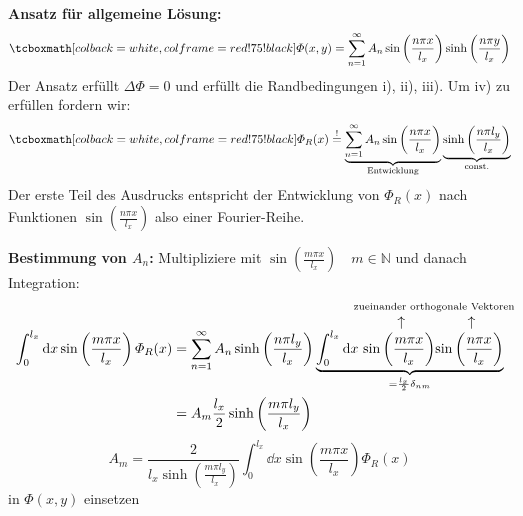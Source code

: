 \textbf{Ansatz für allgemeine Lösung:}
\begin{equation*}
\rmbox{\Phi(x,y) = \sum_{n=1}^{\infty} A_n \sin \left(\frac{n \pi x}{l_x}\right) \sinh \left(\frac{n \pi y}{l_x}\right)}
\end{equation*}
Der Ansatz erfüllt $ \Delta \Phi = 0 $ und erfüllt die Randbedingungen i), ii), iii). Um iv) zu erfüllen fordern wir:
\begin{equation*}
\rmbox{\Phi_R(x) \buildrel ! \over = \ub{\sum_{n=1}^{\infty} A_n \sin\left(\frac{n \pi x}{l_x}\right)}_{\tx{Entwicklung}} \ub{\sinh\left(\frac{n \pi l_y}{l_x}\right)}_{\const}}
\end{equation*}
Der erste Teil des Ausdrucks entspricht der Entwicklung von $ \Phi_R(x) $ nach Funktionen $ \sin \left(\frac{n \pi x}{l_x}\right) $ also einer Fourier-Reihe.\\[5pt]
\begin{comment}
\textbf{Bestimmung von $ A_n $:}
Multipliziere mit $ \sin\left(\frac{n \pi x}{l_x}\right) \quad m \in \mathbb{N} $ und danach Integration:
\begin{align*}
\int_{0}^{l_x} \dd x \sin\left(\frac{n \pi x}{l_x}\right) \Phi_R (x) &=\right)  \sum_{n=1}^{\infty} A_n \sinh\left(\frac{m \pi l_y}{l_x}\right) \int_{0}^{l_x} \dd x \ub{\custoup{\leftarrow}{\sin\left(\frac{m \pi x}{l_x}\right)}{\qquad \qquad \quad \mathclap{\tx{zueinander orthogonale Vektoren}}} \custoup{\leftarrow}{\sin\left(\frac{n \pi x}{l_x}\right)}{}}_{= \frac{l_x}{2} \delta_{nm}}\\
&= A_m \frac{l_x}{2} \sinh\left(\frac{n \pi l_y}{l_x}\right)
\end{align*}
\begin{equation*}
A_m = \frac{2}{l_x \sinh\left(\frac{n \pi l_y}{l_x}\right)} \int_{0}^{l_x} \dd x \sin \left(\frac{n \pi x}{l_x}\right) \Phi_R(x)
\end{equation*}
in $ \Phi(x,y) $ einsetzen\\[5pt]
\end{comment}
\textbf{Bestimmung von $ A_n $:}
Multipliziere mit $ \sin\left(\frac{m \pi x}{l_x}\right) \quad m \in \mathbb{N} $ und danach Integration:
\begin{align*}
\int_{0}^{l_x} \dd x \sin\left(\frac{m \pi x}{l_x}\right) \Phi_R (x) &= \sum_{n=1}^{\infty} A_n \sinh\left(\frac{n \pi l_y}{l_x}\right) \ub{\int_{0}^{l_x} \dd x \ \custoup{\leftarrow}{\sin\left(\frac{m \pi x}{l_x}\right)}{\qquad \qquad \quad \mathclap{\tx{zueinander orthogonale Vektoren}}} \custoup{\leftarrow}{\sin\left(\frac{n \pi x}{l_x}\right)}{}}_{= \frac{l_x}{2} \delta_{nm}}\\
&= A_m \frac{l_x}{2} \sinh\left(\frac{m \pi l_y}{l_x}\right)
\end{align*}
\begin{equation*}
A_m = \frac{2}{l_x \sinh\left(\frac{m \pi l_y}{l_x}\right)} \int_{0}^{l_x} \dd x \sin \left(\frac{m \pi x}{l_x}\right) \Phi_R(x)
\end{equation*}
in $ \Phi(x,y) $ einsetzen\\[5pt]


